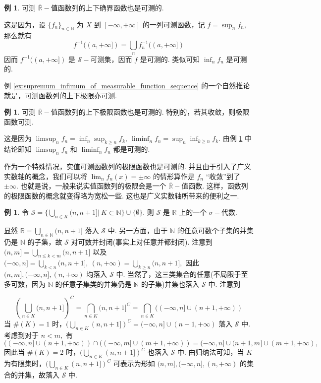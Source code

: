 \documentclass[12pt, a4paper, oneside]{book}
\numberwithin{figure}{section}
\theoremstyle{definition}
\newtheorem{example}[theorem]{例}
\begin{document}
\begin{example}\label{ex:supremum_infimum_of_measurable_function_sequence}
    可测 $\overline{\mathbb R}-$值函数列的上下确界函数也是可测的.
\end{example}
这是因为，设 $\{f_n\}_{n\in\mathbb N}$ 为 $X$ 到 $[-\infty,+\infty]$ 的一列可测函数，记 $f=\sup_n f_n,$
那么就有
\begin{equation}
    f^{-1}((a,+\infty])=\bigcup_n f_n^{-1}((a,+\infty])
\end{equation}
因而 $f^{-1}((a,+\infty])$ 是 $\mathcal S-$可测集，因而 $f$ 是可测的. 类似可知 $\inf_n f_n$ 是可测的.

例 \eqref{ex:supremum_infimum_of_measurable_function_sequence} 的一个自然推论就是，可测函数列的上下极限亦可测.
\begin{example}
    可测 $\overline{\mathbb R}-$值函数列的上下极限函数也是可测的. 特别的，若其收敛，则极限函数可测.
\end{example}
这是因为 $\limsup_n f_n=\inf_n \sup_{k\geq n} f_k,\ \liminf_n f_n=\sup_n \inf_{k\geq n} f_k.$ 由例 \ref{ex:supremum_infimum_of_measurable_function_sequence} 中结论即知 $\limsup_n f_n$ 和 $\liminf_n f_n$ 都是可测的. 

作为一个特殊情况，实值可测函数列的极限函数也是可测的. 并且由于引入了广义实数轴的概念，我们可以将 $\lim_n f_n(x)=\pm\infty$ 的情形算作是 $f_n$ ``收敛''到了 $\pm\infty.$ 也就是说，一般来说实值函数列的极限会是一个 $\overline{\mathbb R}-$值函数. 
这样，函数列的极限函数的概念就变得略为宽松一些. 这也是广义实数轴所带来的便利之一.

\begin{example}
    令 $\mathcal S=\{\bigcup_{n\in K}(n,n+1]|\ K\subset\mathbb N\}\cup\{\emptyset\}.$ 则 $\mathcal S$ 是 $\mathbb R$ 上的一个 $\sigma-$代数.
\end{example}
显然 $\mathbb R=\bigcup_{n\in\mathbb N}(n,n+1]$ 落入 $\mathcal S$ 中. 另一方面，由于 $\mathbb N$ 的任意可数个子集的并集仍是 $\mathbb N$ 的子集，故 
$\mathcal S$ 对可数并封闭(事实上对任意并都封闭).
注意到 
$(n,m]=\bigcup_{n\leq k<m}(n,n+1]$ 以及 $(-\infty,n]=\bigcup_{k<n}(n,n+1],\ (n,+\infty)=\bigcup_{k\geq n}(n,n+1],$ 因此 $(n,m],(-\infty,n],(n,+\infty)$ 均落入 $\mathcal S$ 中.
当然了，这三类集合的任意(不局限于至多可数，因为 $\mathbb N$ 的任意子集类的并集仍是 $\mathbb N$ 的子集)并集也落入 $\mathcal S$ 中. 注意到

\begin{equation}
    \left(\bigcup_{n\in K}(n,n+1]\right)^C=\bigcap_{n\in K} (n,n+1]^C=\bigcap_{n\in K}((-\infty,n]\cup (n+1,+\infty))
\end{equation}
当 $\#(K)=1$ 时，$(\bigcup_{n\in K}(n,n+1])^C=(-\infty,n]\cup (n+1,+\infty)$ 落入 $\mathcal S$ 中. 
考虑到对于 $n<m,$ 有 $((-\infty,n]\cup (n+1,+\infty))\cap ((-\infty,m]\cup (m+1,+\infty))=(-\infty,n]\cup (n+1,m]\cup (m+1,+\infty),$ 因此当 $\#(K)=2$ 时，$(\bigcup_{n\in K}(n,n+1])^C$ 也落入 $\mathcal S$ 中. 
由归纳法可知，当 $K$ 为有限集时，$(\bigcup_{n\in K}(n,n+1])^C$ 可表示为形如 $(n,m],(-\infty,n],(n,+\infty)$ 的集合的并集，故落入 $\mathcal S$ 中.
\end{document}
